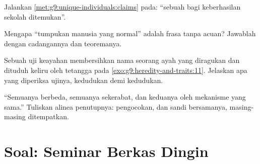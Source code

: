 \begin{exercise}[$\star\star$]\label{exo:g9:unique-individuals:9}
Jalankan \cref{met:g9:unique-individuals:claims} pada:
``sebuah  bagi keberhasilan sekolah ditemukan''.
\end{exercise}

\begin{exercise}[$\star\star$]\label{exo:g9:unique-individuals:10}
Mengapa ``tumpukan manusia yang normal'' adalah frasa tanpa
acuan? Jawablah dengan cadangannya dan teoremanya.
\end{exercise}

\begin{exercise}[$\star\star$]\label{exo:g9:unique-individuals:11}
Sebuah uji keayahan membersihkan nama seorang ayah yang
diragukan dan dituduh keliru oleh tetangga pada
\cref{exo:g9:heredity-and-traits:11}. Jelaskan apa yang
diperiksa ujinya, kedudukan demi kedudukan.
\end{exercise}

\begin{exercise}[$\star\star\star$]\label{exo:g9:unique-individuals:12}
``Semuanya berbeda, semuanya sekerabat, dan keduanya oleh
mekanisme yang sama.'' Tuliskan alinea penutupnya:
pengocokan,  dan sandi bersamanya, masing-masing
ditempatkan.
\end{exercise}

\section{Soal: Seminar Berkas Dingin}

